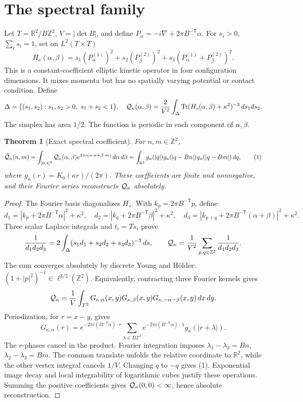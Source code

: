 \documentclass[11pt]{article}
\newtheorem{theorem}{Theorem}
\begin{document}
\section{The spectral family}
Let \(T=\mathbb R^2/B\mathbb Z^2\), \(V=|\det B|\), and define
\(P_\alpha=-i\nabla+2\pi B^{-\mathsf T}\alpha\).
For \(s_i>0\), \(\sum_i s_i=1\), set on \(L^2(T\times T)\)
\[
 H_s(\alpha,\beta)=s_1(P_\alpha^{(1)})^2
 +s_2(P_\beta^{(2)})^2
 +s_3(P_\alpha^{(1)}+P_\beta^{(2)})^2.
\]
This is a constant-coefficient elliptic kinetic operator in four
configuration dimensions. It mixes momenta but has no spatially
varying potential or contact condition. Define
\[
 \Delta=\{(s_1,s_2):s_1,s_2>0,\ s_1+s_2<1\},\quad
 {\cal Q}_\kappa(\alpha,\beta)=\frac{2}{V^2}\int_\Delta
 \operatorname{Tr}(H_s(\alpha,\beta)+\kappa^2)^{-3}\,ds_1ds_2.
\]
The simplex has area \(1/2\). The function is periodic in each
component of \(\alpha,\beta\).

\begin{theorem}[Exact spectral coefficient]
For \(n,m\in\mathbb Z^2\),
\[
 \widehat{\cal Q}_\kappa(n,m)=
 \int_{[0,1]^4}{\cal Q}_\kappa(\alpha,\beta)
 e^{2\pi i(\alpha\cdot n+\beta\cdot m)}\,d\alpha\,d\beta
 =\int_{\mathbb R^2}g_\kappa(|q|)
 g_\kappa(|q-Bn|)g_\kappa(|q-Bm|)\,dq,
 \tag{1}
\]
where \(g_\kappa(r)=K_0(\kappa r)/(2\pi)\).
These coefficients are finite and nonnegative, and their Fourier
series reconstructs \({\cal Q}_\kappa\) absolutely.
\end{theorem}
\begin{proof}
The Fourier basis diagonalizes \(H_s\). With
\(k_p=2\pi B^{-\mathsf T}p\), define
\[
 d_1=|k_p+2\pi B^{-\mathsf T}\alpha|^2+\kappa^2,\quad
 d_2=|k_q+2\pi B^{-\mathsf T}\beta|^2+\kappa^2,\quad
 d_3=|k_{p+q}+2\pi B^{-\mathsf T}(\alpha+\beta)|^2+\kappa^2.
\]
Three scalar Laplace integrals and \(t_i=Ts_i\) prove
\[
 \frac1{d_1d_2d_3}=2\int_\Delta(s_1d_1+s_2d_2+s_3d_3)^{-3}\,ds,
 \qquad {\cal Q}_\kappa=\frac1{V^2}\sum_{p,q\in\mathbb Z^2}
 \frac1{d_1d_2d_3}.
\]
The sum converges absolutely by discrete Young and H\"older:
\((1+|p|^2)^{-1}\in\ell^{3/2}(\mathbb Z^2)\).
Equivalently, contracting three Fourier kernels gives
\[
 {\cal Q}_\kappa=\frac1V\int_{T^2}
 G_{\kappa,\alpha}(x,y)G_{\kappa,\beta}(x,y)
 G_{\kappa,-\alpha-\beta}(x,y)\,dx\,dy.
\]
Periodization, for \(r=x-y\), gives
\[
 G_{\kappa,\alpha}(r)=e^{-2\pi i(B^{-\mathsf T}\alpha)\cdot r}
 \sum_{\lambda\in B\mathbb Z^2}
 e^{-2\pi i(B^{-\mathsf T}\alpha)\cdot\lambda}g_\kappa(|r+\lambda|).
\]
The \(r\)-phases cancel in the product. Fourier integration imposes
\(\lambda_1-\lambda_3=Bn\), \(\lambda_2-\lambda_3=Bm\).
The common translate unfolds the relative coordinate to
\(\mathbb R^2\), while the other vertex integral cancels \(1/V\).
Changing \(q\) to \(-q\) gives (1).
Exponential image decay and local integrability of logarithmic cubes
justify these operations. Summing the positive coefficients gives
\({\cal Q}_\kappa(0,0)<\infty\), hence absolute reconstruction.
\end{proof}
\end{document}
